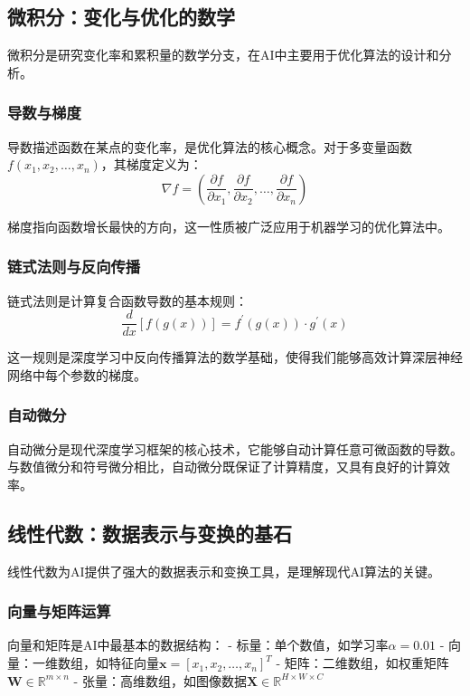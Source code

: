 \subsection{微积分：变化与优化的数学}

微积分是研究变化率和累积量的数学分支，在AI中主要用于优化算法的设计和分析。

\subsubsection{导数与梯度}
导数描述函数在某点的变化率，是优化算法的核心概念。对于多变量函数$f(x_1, x_2, \ldots, x_n)$，其梯度定义为：
$$
\nabla f = \left(\frac{\partial f}{\partial x_1}, \frac{\partial f}{\partial x_2}, \ldots, \frac{\partial f}{\partial x_n}\right)$$

梯度指向函数增长最快的方向，这一性质被广泛应用于机器学习的优化算法中。

\subsubsection{链式法则与反向传播}
链式法则是计算复合函数导数的基本规则：
$$\frac{d}{dx}[f(g(x))] = f^\prime(g(x)) \cdot g^\prime(x)$$

这一规则是深度学习中反向传播算法的数学基础，使得我们能够高效计算深层神经网络中每个参数的梯度。

\subsubsection{自动微分}
自动微分是现代深度学习框架的核心技术，它能够自动计算任意可微函数的导数。与数值微分和符号微分相比，自动微分既保证了计算精度，又具有良好的计算效率。

\subsection{线性代数：数据表示与变换的基石}

线性代数为AI提供了强大的数据表示和变换工具，是理解现代AI算法的关键。

\subsubsection{向量与矩阵运算}
向量和矩阵是AI中最基本的数据结构：
- 标量：单个数值，如学习率$\alpha = 0.01$
- 向量：一维数组，如特征向量$\mathbf{x} = [x_1, x_2, \ldots, x_n]^T$
- 矩阵：二维数组，如权重矩阵$\mathbf{W} \in \mathbb{R}^{m \times n}$
- 张量：高维数组，如图像数据$\mathbf{X} \in \mathbb{R}^{H \times W \times C}$

